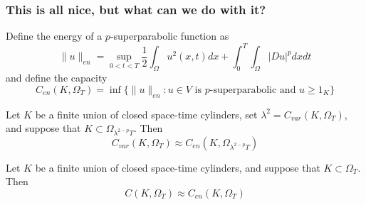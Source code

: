 \documentclass[10pt]{beamer}
\begin{document}
\begin{frame}
	\frametitle{This is all nice, but what can we do with it?}
	Define the energy of a $p$-superparabolic function as
	\begin{equation} \nonumber \label{}
		\|u\|_{en} = \sup_{0 < t < T} \frac{1}{2} \int_{\Omega} u^2(x,t) dx + \int_0^T \int_{\Omega} |D u|^p dx dt
	\end{equation}
	and define the capacity
	\begin{equation} \nonumber \label{}
		C_{en} (K, \Omega_T) = \inf \{\|u\|_{en}: \text{$u \in V$ is $p$-superparabolic and $u \geq 1_K$}\}  
	\end{equation}
	\pause
	\begin{theorem}
		Let $K$ be a finite union of closed space-time cylinders, set $\lambda^2 = C_{var}(K,\Omega_T)$, and suppose that $K \subset \Omega_{\lambda^{2-p}T}$. Then
		\begin{equation} \nonumber \label{}
			C_{var}(K,\Omega_T) \approx C_{en}(K,\Omega_{\lambda^{2-p}T})
		\end{equation}
	\end{theorem}
	\pause
	\begin{theorem}
		Let $K$ be a finite union of closed space-time cylinders, and suppose that $K \subset \Omega_T$. Then
		\begin{equation} \nonumber \label{}
			C(K,\Omega_T) \approx C_{en}(K,\Omega_T)
		\end{equation}
	\end{theorem}
\end{frame}
\end{document}
